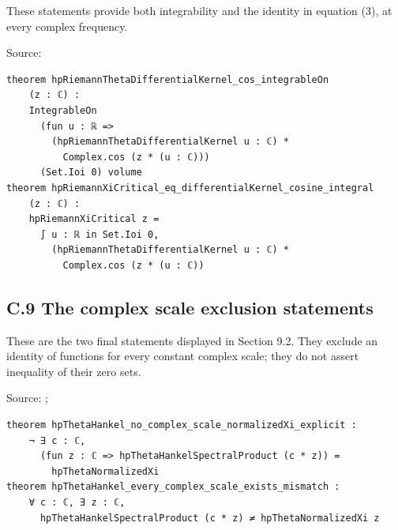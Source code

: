 \documentclass[
  11pt,
]{article}
\begin{document}
These statements provide both integrability and the identity in equation (3), at every complex frequency.

Source: 

\begin{verbatim}
theorem hpRiemannThetaDifferentialKernel_cos_integrableOn
    (z : ℂ) :
    IntegrableOn
      (fun u : ℝ =>
        (hpRiemannThetaDifferentialKernel u : ℂ) *
          Complex.cos (z * (u : ℂ)))
      (Set.Ioi 0) volume
theorem hpRiemannXiCritical_eq_differentialKernel_cosine_integral
    (z : ℂ) :
    hpRiemannXiCritical z =
      ∫ u : ℝ in Set.Ioi 0,
        (hpRiemannThetaDifferentialKernel u : ℂ) *
          Complex.cos (z * (u : ℂ))
\end{verbatim}

\hypertarget{c.9-the-complex-scale-exclusion-statements}{%
\subsection{C.9 The complex scale exclusion statements}\label{c.9-the-complex-scale-exclusion-statements}}

These are the two final statements displayed in Section 9.2. They exclude an identity of functions for every constant complex scale; they do not assert inequality of their zero sets.

Source: ; 

\begin{verbatim}
theorem hpThetaHankel_no_complex_scale_normalizedXi_explicit :
    ¬ ∃ c : ℂ,
      (fun z : ℂ => hpThetaHankelSpectralProduct (c * z)) =
        hpThetaNormalizedXi
theorem hpThetaHankel_every_complex_scale_exists_mismatch :
    ∀ c : ℂ, ∃ z : ℂ,
      hpThetaHankelSpectralProduct (c * z) ≠ hpThetaNormalizedXi z
\end{verbatim}
\end{document}

